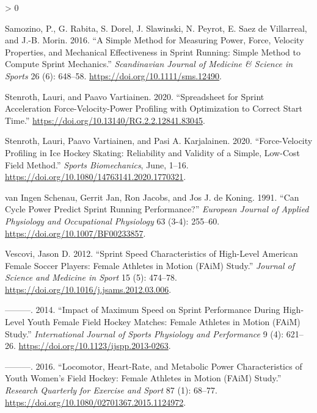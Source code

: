 \documentclass[fleqn,10pt]{wlpeerj} %
\newlength{\cslhangindent}
\newenvironment{CSLReferences}[2] %
 {%
  \setlength{\parindent}{0pt}
  \ifodd #1 \everypar{\setlength{\hangindent}{\cslhangindent}}\ignorespaces\fi
  \ifnum #2 > 0
  \setlength{\parskip}{#2\baselineskip}
  \fi
 }%
 {}
\begin{document}
\begin{CSLReferences}{1}{0}
\leavevmode\hypertarget{ref-samozinoSimpleMethodMeasuring2016}{}%
Samozino, P., G. Rabita, S. Dorel, J. Slawinski, N. Peyrot, E. Saez de Villarreal, and J.-B. Morin. 2016. {``A Simple Method for Measuring Power, Force, Velocity Properties, and Mechanical Effectiveness in Sprint Running: {Simple} Method to Compute Sprint Mechanics.''} \emph{Scandinavian Journal of Medicine \& Science in Sports} 26 (6): 648--58. \url{https://doi.org/10.1111/sms.12490}.

\leavevmode\hypertarget{ref-stenrothSpreadsheetSprintAcceleration2020}{}%
Stenroth, Lauri, and Paavo Vartiainen. 2020. {``Spreadsheet for Sprint Acceleration Force-Velocity-Power Profiling with Optimization to Correct Start Time.''} \url{https://doi.org/10.13140/RG.2.2.12841.83045}.

\leavevmode\hypertarget{ref-stenrothForcevelocityProfilingIce2020}{}%
Stenroth, Lauri, Paavo Vartiainen, and Pasi A. Karjalainen. 2020. {``Force-Velocity Profiling in Ice Hockey Skating: Reliability and Validity of a Simple, Low-Cost Field Method.''} \emph{Sports Biomechanics}, June, 1--16. \url{https://doi.org/10.1080/14763141.2020.1770321}.

\leavevmode\hypertarget{ref-vaningenschenauCanCyclePower1991}{}%
van Ingen Schenau, Gerrit Jan, Ron Jacobs, and Jos J. de Koning. 1991. {``Can Cycle Power Predict Sprint Running Performance?''} \emph{European Journal of Applied Physiology and Occupational Physiology} 63 (3-4): 255--60. \url{https://doi.org/10.1007/BF00233857}.

\leavevmode\hypertarget{ref-vescoviSprintSpeedCharacteristics2012}{}%
Vescovi, Jason D. 2012. {``Sprint Speed Characteristics of High-Level {American} Female Soccer Players: {Female Athletes} in {Motion} ({FAiM}) {Study}.''} \emph{Journal of Science and Medicine in Sport} 15 (5): 474--78. \url{https://doi.org/10.1016/j.jsams.2012.03.006}.

\leavevmode\hypertarget{ref-vescoviImpactMaximumSpeed2014}{}%
---------. 2014. {``Impact of {Maximum Speed} on {Sprint Performance During High}-{Level Youth Female Field Hockey Matches}: {Female Athletes} in {Motion} ({FAiM}) {Study}.''} \emph{International Journal of Sports Physiology and Performance} 9 (4): 621--26. \url{https://doi.org/10.1123/ijspp.2013-0263}.

\leavevmode\hypertarget{ref-vescoviLocomotorHeartRateMetabolic2016}{}%
---------. 2016. {``Locomotor, {Heart}-{Rate}, and {Metabolic Power Characteristics} of {Youth Women}'s {Field Hockey}: {Female Athletes} in {Motion} ({FAiM}) {Study}.''} \emph{Research Quarterly for Exercise and Sport} 87 (1): 68--77. \url{https://doi.org/10.1080/02701367.2015.1124972}.


\end{CSLReferences}
\end{document}
